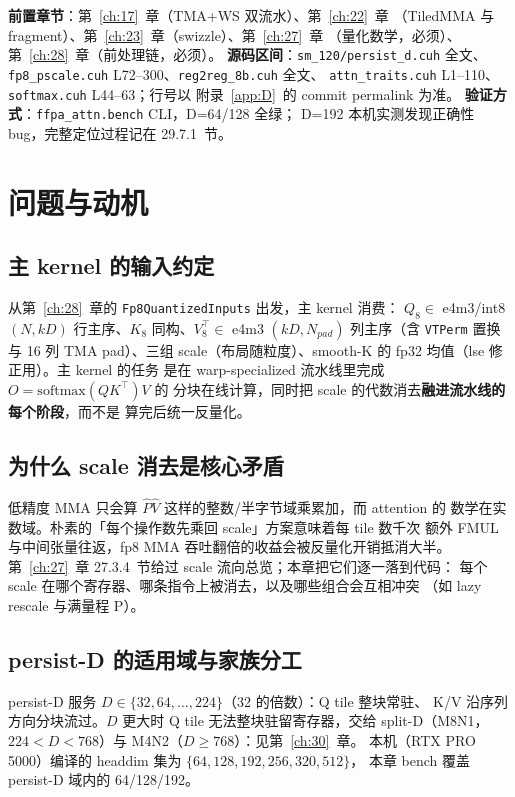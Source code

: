 \textbf{前置章节}：第~\ref{ch:17}~章（TMA+WS 双流水）、第~\ref{ch:22}~章
（TiledMMA 与 fragment）、第~\ref{ch:23}~章（swizzle）、第~\ref{ch:27}~章
（量化数学，必须）、第~\ref{ch:28}~章（前处理链，必须）。
\textbf{源码区间}：\texttt{sm\_120/persist\_d.cuh} 全文、
\texttt{fp8\_pscale.cuh} L72--300、\texttt{reg2reg\_8b.cuh} 全文、
\texttt{attn\_traits.cuh} L1--110、\texttt{softmax.cuh} L44--63；行号以
附录~\ref{app:D}~的 commit permalink 为准。
\textbf{验证方式}：\texttt{ffpa\_attn.bench} CLI，D=64/128 全绿；
D=192 本机实测发现正确性 bug，完整定位过程记在 29.7.1~节。

\section{问题与动机}

\subsection{主 kernel 的输入约定}

从第~\ref{ch:28}~章的 \texttt{Fp8QuantizedInputs} 出发，主 kernel 消费：
$Q_8\in$ e4m3/int8 $(N,kD)$ 行主序、$K_8$ 同构、$V_8^{\top}\in$ e4m3
$(kD,N_{pad})$ 列主序（含 \texttt{VTPerm} 置换与 16 列 TMA pad）、三组
scale（布局随粒度）、smooth-K 的 fp32 均值（lse 修正用）。主 kernel 的任务
是在 warp-specialized 流水线里完成 $O = \mathrm{softmax}(QK^{\top})V$ 的
分块在线计算，同时把 scale 的代数消去\textbf{融进流水线的每个阶段}，而不是
算完后统一反量化。

\subsection{为什么 scale 消去是核心矛盾}

低精度 MMA 只会算 $\hat P\hat V$ 这样的整数/半字节域乘累加，而 attention 的
数学在实数域。朴素的「每个操作数先乘回 scale」方案意味着每 tile 数千次
额外 FMUL 与中间张量往返，fp8 MMA 吞吐翻倍的收益会被反量化开销抵消大半。
第~\ref{ch:27}~章 27.3.4~节给过 scale 流向总览；本章把它们逐一落到代码：
每个 scale 在哪个寄存器、哪条指令上被消去，以及哪些组合会互相冲突
（如 lazy rescale 与满量程 P）。

\subsection{persist-D 的适用域与家族分工}

persist-D 服务 $D\in\{32,64,\dots,224\}$（32 的倍数）：Q tile 整块常驻、
K/V 沿序列方向分块流过。$D$ 更大时 Q tile 无法整块驻留寄存器，交给
split-D（M8N1，$224<D<768$）与 M4N2（$D\ge768$）：见第~\ref{ch:30}~章。
本机（RTX PRO 5000）编译的 headdim 集为 $\{64,128,192,256,320,512\}$，
本章 bench 覆盖 persist-D 域内的 64/128/192。

